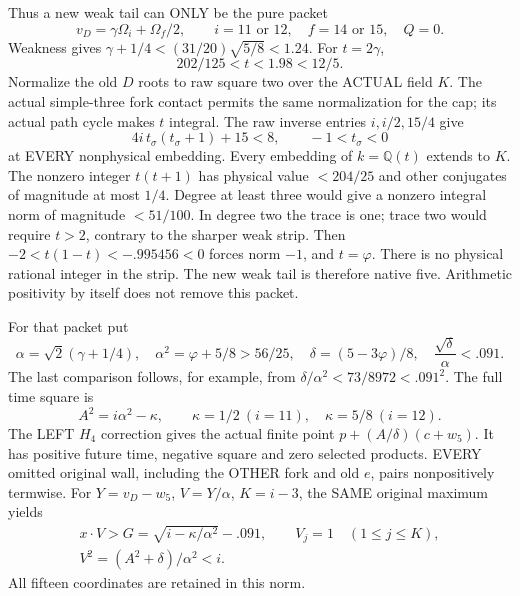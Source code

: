 \documentclass[11pt]{article}
\begin{document}
Thus a new weak tail can ONLY be the pure packet
\[
 v_D=\gamma\Omega_i+\Omega_f/2,\qquad
 i=11\text{ or }12,\quad f=14\text{ or }15,\quad Q=0 .
\]
Weakness gives
\(\gamma+1/4<(31/20)\sqrt{5/8}<1.24\).
For \(t=2\gamma\),
\[
                    202/125<t<1.98<12/5 .
\]
Normalize the old \(D\) roots to raw square two over
the ACTUAL field \(K\).
The actual simple-three fork contact permits the same
normalization for the cap; its actual path cycle makes
\(t\) integral.
The raw inverse entries \(i,i/2,15/4\) give
\[
             4i\,t_\sigma(t_\sigma+1)+15<8,
             \qquad -1<t_\sigma<0
\]
at EVERY nonphysical embedding.
Every embedding of \(k=\mathbb Q(t)\) extends to \(K\).
The nonzero integer \(t(t+1)\) has physical value
\(<204/25\) and other conjugates of magnitude at most \(1/4\).
Degree at least three would give a nonzero integral norm
of magnitude \(<51/100\).
In degree two the trace is one; trace two would require
\(t>2\), contrary to the sharper weak strip.
Then \(-2<t(1-t)<-.995456<0\) forces norm \(-1\),
and \(t=\varphi\).
There is no physical rational integer in the strip.
The new weak tail is therefore native five.
Arithmetic positivity by itself does not remove this packet.

For that packet put
\[
 \alpha=\sqrt2(\gamma+1/4),\quad
 \alpha^2=\varphi+5/8>56/25,\quad
 \delta=(5-3\varphi)/8,\quad
 {\frac{\sqrt\delta}{\alpha}}<.091 .
\]
The last comparison follows, for example, from
\(\delta/\alpha^2<73/8972<.091^2\).
The full time square is
\[
 A^2=i\alpha^2-\kappa,\qquad
 \kappa=1/2\ (i=11),\quad \kappa=5/8\ (i=12).
\]
The LEFT \(H_4\) correction gives the actual finite point
\(p+(A/\delta)(c+w_5)\).
It has positive future time, negative square and zero
selected products.
EVERY omitted original wall, including the OTHER fork
and old \(e\), pairs nonpositively termwise.
For \(Y=v_D-w_5\), \(V=Y/\alpha\), \(K=i-3\),
the SAME original maximum yields
\[
 \begin{gathered}
 x\cdot V>G=\sqrt{i-\kappa/\alpha^2}-.091,\qquad
 V_j=1\quad(1\le j\le K),\\
 V^2=(A^2+\delta)/\alpha^2<i .
 \end{gathered}
\]
All fifteen coordinates are retained in this norm.
\end{document}
